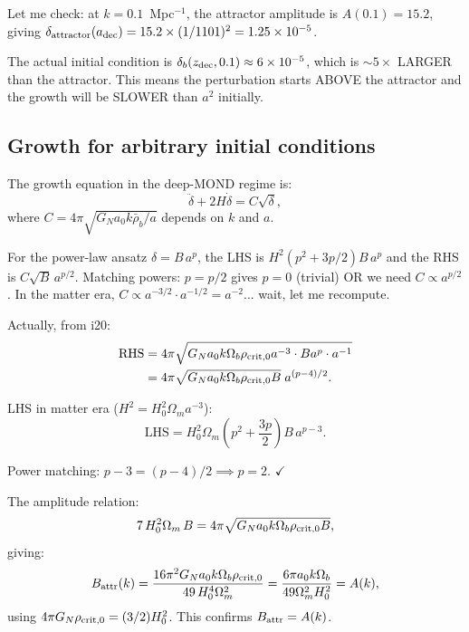 \documentclass[11pt]{article}
\newcommand{\ee}[1]{\times 10^{#1}}
\newcommand{\aM}{a_0}
\newcommand{\rhob}{\bar{\rho}_b}
\newcommand{\Ob}{\Omega_b}
\newcommand{\Om}{\Omega_m}
\begin{document}
Let me check: at $k = 0.1$~Mpc$^{-1}$, the attractor amplitude is
$A(0.1) = 15.2$, giving
$\delta_{\rm attractor}(a_{\rm dec}) = 15.2\times(1/1101)^2
= 1.25\ee{-5}$.

The actual initial condition is $\delta_b(z_{\rm dec}, 0.1)
\approx 6\ee{-5}$, which is $\sim 5\times$ LARGER than the
attractor. This means the perturbation starts ABOVE the attractor
and the growth will be SLOWER than $a^2$ initially.

\subsection{Growth for arbitrary initial conditions}

The growth equation in the deep-MOND regime is:
\begin{equation}
\ddot\delta + 2H\dot\delta = C\sqrt{\delta},
\label{eq:growth-NL}
\end{equation}
where $C = 4\pi\sqrt{G_N\aM k\rhob/a}$ depends on $k$ and $a$.

For the power-law ansatz $\delta = B\,a^p$, the LHS is
$H^2(p^2 + 3p/2)B\,a^p$ and the RHS is $C\sqrt{B}\,a^{p/2}$.
Matching powers: $p = p/2$ gives $p = 0$ (trivial) OR we need
$C \propto a^{p/2}$. In the matter era,
$C \propto a^{-3/2}\cdot a^{-1/2} = a^{-2}$... wait, let me recompute.

Actually, from i20:
\begin{align}
\text{RHS} &= 4\pi\sqrt{G_N\aM k\Ob\rho_{\rm crit,0} a^{-3}\cdot B a^p\cdot a^{-1}} \\
&= 4\pi\sqrt{G_N\aM k\Ob\rho_{\rm crit,0} B}\;a^{(p-4)/2}.
\end{align}

LHS in matter era ($H^2 = H_0^2\Om a^{-3}$):
\begin{equation}
\text{LHS} = H_0^2\Om\left(p^2 + \frac{3p}{2}\right)B\,a^{p-3}.
\end{equation}

Power matching: $p - 3 = (p-4)/2 \implies p = 2$. $\checkmark$

The amplitude relation:
\begin{equation}
7\,H_0^2\Om\,B = 4\pi\sqrt{G_N\aM k\Ob\rho_{\rm crit,0} B},
\end{equation}
giving:
\begin{equation}
B_{\rm attr}(k) = \frac{16\pi^2 G_N\aM k\Ob\rho_{\rm crit,0}}{49\,H_0^4\Om^2}
= \frac{6\pi\aM k\Ob}{49\Om^2 H_0^2} = A(k),
\end{equation}
using $4\pi G_N\rho_{\rm crit,0} = (3/2)H_0^2$. This confirms
$B_{\rm attr} = A(k)$.
\end{document}
